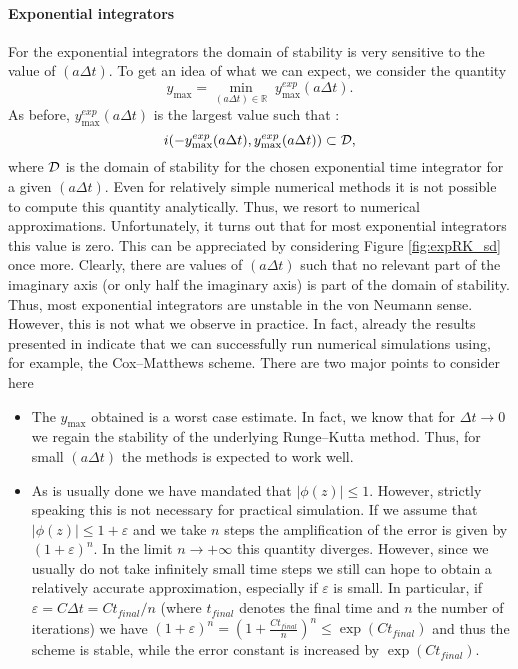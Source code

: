 \paragraph{Exponential integrators\\}
For the exponential integrators the domain of stability is very sensitive to the value of $(a\Delta t)$. To get an idea of what we can expect, we consider the quantity $$y_{\max}=\min_{(a\Delta t)\in\mathbb{R}} \; y^{exp}_{\max}(a \Delta t).$$ As before, $y^{exp}_{\max}(a\Delta t)$ is the largest value such that : $$i(-y^{exp}_{\max}(a\Delta t), y^{exp}_{\max}(a\Delta t))\subset {\cal D},$$ where ${\cal D}$ is the domain of stability for the chosen exponential time integrator for a given $(a\Delta t)$. Even for relatively simple numerical methods it is not possible to compute this quantity analytically. Thus, we resort to numerical approximations. Unfortunately, it turns out that for most exponential integrators this value is zero. This can be appreciated by considering Figure \ref{fig:expRK_sd} once more. Clearly, there are values of $(a \Delta t)$ such that no relevant part of the imaginary axis (or only half the imaginary axis) is part of the domain of stability. Thus, most exponential integrators are unstable in the von Neumann sense. However, this is not what we observe in practice. In fact, already the results presented in \cite{Crouseilles:2018} indicate that we can successfully run numerical simulations using, for example, the Cox--Matthews scheme. There are two major points to consider here
\begin{itemize}
    \item The $y_{\max}$ obtained is a worst case estimate. In fact, we know that for $\Delta t \to 0$ we regain the stability of the underlying Runge--Kutta method. Thus, for small $(a \Delta t)$ the methods is expected to work well.
    \item As is usually done we have mandated that $\vert \phi(z) \vert \leq 1$. However, strictly speaking this is not necessary for practical simulation. If we assume that $\vert \phi(z) \vert \leq 1+\varepsilon$ and we take $n$ steps the amplification of the error is given by $(1+\varepsilon)^n$. In the limit $n \to +\infty$ this quantity diverges. However, since we usually do not take infinitely small time steps we still can hope to obtain a relatively accurate approximation, especially if $\varepsilon$ is small. In particular, if $\varepsilon = C \Delta t = C t_{final}/n$ (where $t_{final}$ denotes the final time and $n$ the number of iterations) we have $(1+\varepsilon)^n = (1+\tfrac{C t_{final}}{n} )^n \leq \exp(C t_{final})$ and thus the scheme is stable, while the error constant is increased by $\exp(C t_{final})$.
\end{itemize}

